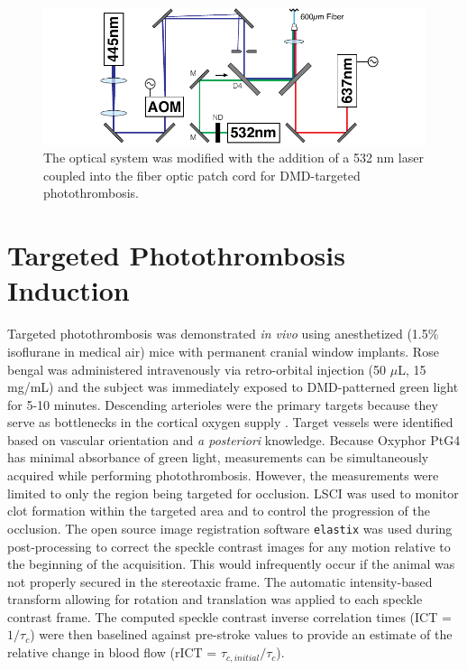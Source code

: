 \begin{figure}
    \includegraphics{figures/chapter_3/systemschematic_2.pdf}
    \caption{
        \label{fig:systemschematic_2}
        The optical system was modified with the addition of a 532 nm laser coupled into the fiber optic patch cord for DMD-targeted photothrombosis.
    }
\end{figure}



\section{Targeted Photothrombosis Induction} \label{sec:photothrombosis_induction}

Targeted photothrombosis was demonstrated \textit{in vivo} using anesthetized (1.5\% isoflurane in medical air) mice with permanent cranial window implants. Rose bengal was administered intravenously via retro-orbital injection (50 $\mu$L, 15 mg/mL) and the subject was immediately exposed to DMD-patterned green light for 5-10 minutes. Descending arterioles were the primary targets because they serve as bottlenecks in the cortical oxygen supply \cite{Nishimura:2007hk}. Target vessels were identified based on vascular orientation and \textit{a posteriori} knowledge. Because Oxyphor PtG4 has minimal absorbance of green light,  measurements can be simultaneously acquired while performing photothrombosis. However, the measurements were limited to only the region being targeted for occlusion. LSCI was used to monitor clot formation within the targeted area and to control the progression of the occlusion. The open source image registration software \texttt{elastix} \cite{Klein:2010gr} was used during post-processing to correct the speckle contrast images for any motion relative to the beginning of the acquisition. This would infrequently occur if the animal was not properly secured in the stereotaxic frame. The automatic intensity-based transform allowing for rotation and translation was applied to each speckle contrast frame. The computed speckle contrast inverse correlation times (ICT = $1/\tau_c$) were then baselined against pre-stroke values to provide an estimate of the relative change in blood flow (rICT = $\tau_{c,initial}/\tau_c$).

